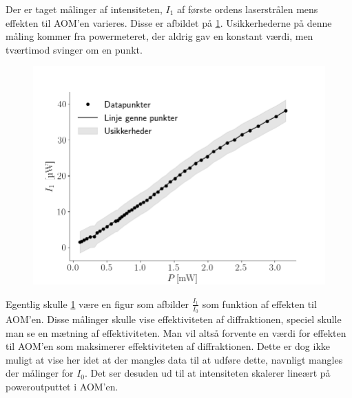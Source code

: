 \documentclass[main]{subfiles}
\begin{document}
\bigskip

Der er taget målinger af intensiteten, $I_1$ af første ordens laserstrålen mens effekten til AOM'en varieres. Disse er afbildet på \cref{fig:graf2}. Usikkerhederne på denne måling kommer fra  powermeteret, der aldrig gav en konstant værdi, men tværtimod svinger om en punkt. 

\begin{figure}[H]
    \centering
    \includegraphics[width=\linewidth]{tegninger/graf2.png}
    \caption{}
    \label{fig:graf2}
\end{figure}
Egentlig skulle \cref{fig:graf2} være en figur som afbilder $\frac{I_1}{I_0}$ som funktion af effekten til AOM'en. Disse målinger skulle vise effektiviteten af diffraktionen, speciel skulle man se en mætning af effektiviteten. Man vil altså forvente en værdi for effekten til AOM'en som maksimerer effektiviteten af diffraktionen. Dette er dog ikke muligt at vise her idet at der mangles data til at udføre dette, navnligt mangles der målinger for $I_0$. Det ser desuden ud til at intensiteten skalerer lineært på poweroutputtet i AOM'en.
\end{document}
